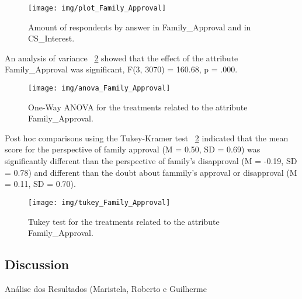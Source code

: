 \begin{figure}%
\texttt{[image: img/plot\_Family\_Approval]}%
\caption{Amount of respondents by answer in Family_Approval and in CS_Interest.}%
\label{fig:plot_Family_Approval}%
\end{figure}%

An analysis of variance ~\ref{fig:ANOVA_Family_Approval} showed that the effect of the attribute Family_Approval was significant, F(3, 3070) = 160.68, p = .000.

\begin{figure}%
\texttt{[image: img/anova\_Family\_Approval]}%
\caption{One-Way ANOVA for the treatments related to the attribute Family_Approval.}%
\label{fig:ANOVA_Family_Approval}%
\end{figure}%

Post hoc comparisons using the Tukey-Kramer test ~\ref{fig:ANOVA_Family_Approval} indicated that the mean score for the perspective of family approval (M = 0.50, SD = 0.69) was significantly different than the perspective of family's disapproval (M = -0.19, SD = 0.78) and different than the doubt about fammily's approval or disapproval (M = 0.11, SD = 0.70).  

\begin{figure}%
\texttt{[image: img/tukey\_Family\_Approval]}%
\caption{Tukey test for the treatments related to the attribute Family_Approval.}%
\label{fig:TUKEY_Family_Approval}%
\end{figure}%

\subsection{Discussion}\label{subsec:discussion}%
Análise dos Resultados (Maristela, Roberto e Guilherme
